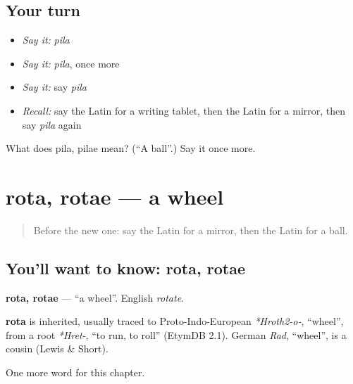 \subsection*{Your turn}
\begin{itemize}
\raggedright
  \item \emph{Say it:} \emph{pila}
  \item \emph{Say it:} \emph{pila}, once more
  \item \emph{Say it:} say \emph{pila}
  \item \emph{Recall:} say the Latin for a writing tablet, then the Latin for a mirror, then say \emph{pila} again
\end{itemize}

\begin{tcolorbox}[breakable,colback=teal!4,colframe=teal!35!black,title={Before you move on}]
What does pila, pilae mean? (\textquotedblleft{}A ball\textquotedblright{}.) Say it once more.
\end{tcolorbox}
\section[rota, rotae]{rota, rotae — a wheel}

\label{lesson:LA-C85-rota}



\begin{quote}
Before the new one: say the Latin for a mirror, then the Latin for a ball.
\end{quote}

\subsection*{You'll want to know: rota, rotae}
\textbf{rota, rotae} — \textquotedblleft{}a wheel\textquotedblright{}. English \emph{rotate}.

\begin{cousinweb}
\textbf{rota} is inherited, usually traced to Proto-Indo-European \emph{*Hroth2-o-}, \textquotedblleft{}wheel\textquotedblright{}, from a root \emph{*Hret-}, \textquotedblleft{}to run, to roll\textquotedblright{} (EtymDB 2.1). German \emph{Rad}, \textquotedblleft{}wheel\textquotedblright{}, is a cousin (Lewis \& Short).
\end{cousinweb}

\begin{grammarlens}[title={What you've built}]
One more word for this chapter.
\end{grammarlens}

